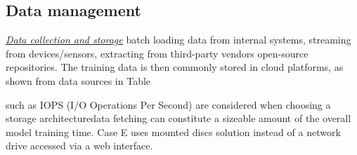 


\subsection{Data management}

\underline{\emph{Data collection and storage}}
\DIFdelbegin {}\DIFdelend \DIFaddbegin {}\DIFaddend batch loading data from internal systems, streaming from devices/sensors, extracting from \DIFdelbegin {}\DIFdelend third-party vendors \DIFdelbegin {}\DIFdelend \DIFaddbegin {}\DIFaddend open-source repositories. The training data is then commonly stored in cloud platforms, as shown from data sources in Table ~\DIFdelbegin {}\DIFdelend \DIFaddbegin {}\DIFaddend 

\DIFdelbegin {}%

\DIFdelend \DIFaddbegin {}\DIFaddend such as IOPS (I/O Operations Per Second) \DIFdelbegin \DIFdel{, }\DIFdelend are considered when choosing a storage architecture\DIFdelbegin {}\DIFdelend \DIFaddbegin \DIFadd{; }\DIFaddend data fetching can constitute a sizeable amount of the overall model training time. Case E uses \DIFaddbegin {}\DIFaddend mounted discs solution instead of a network drive accessed via a web interface. %

